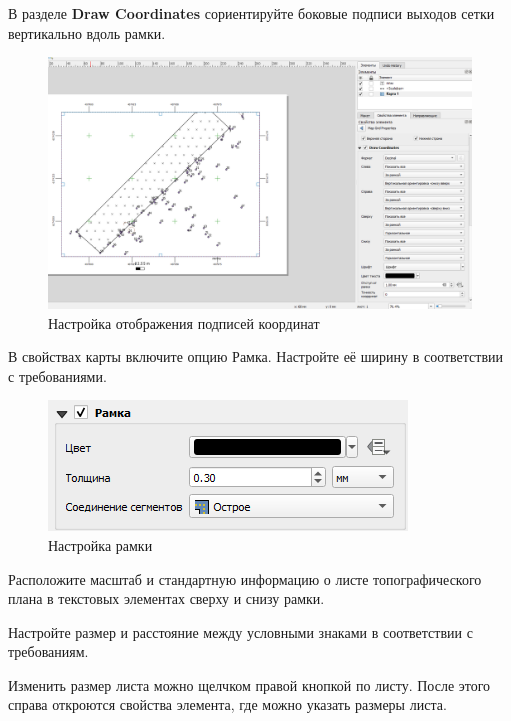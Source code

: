 \documentclass[
  12pt,
]{book}
\begin{document}
В разделе \textbf{Draw Coordinates} сориентируйте боковые подписи выходов сетки вертикально вдоль рамки.

\begin{figure}
\centering
\includegraphics{images/symbology/Draw_coordinates.png}
\caption{Настройка отображения подписей координат}
\end{figure}

В свойствах карты включите опцию Рамка. Настройте её ширину в соответствии с требованиями.

\begin{figure}
\centering
\includegraphics{images/symbology/Border.png}
\caption{Настройка рамки}
\end{figure}

Расположите масштаб и стандартную информацию о листе топографического плана в текстовых элементах сверху и снизу рамки.

Настройте размер и расстояние между условными знаками в соответствии с требованиям.

Изменить размер листа можно щелчком правой кнопкой по листу. После этого справа откроются свойства элемента, где можно указать размеры листа.
\end{document}
